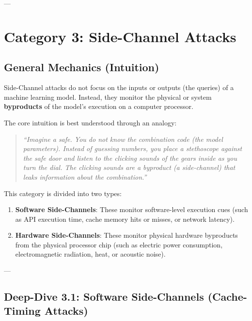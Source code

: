 \documentclass{article}
\begin{document}
---

\section{Category 3: Side-Channel Attacks}

\subsection{General Mechanics (Intuition)}
Side-Channel attacks do not focus on the inputs or outputs (the queries) of a machine learning model. Instead, they monitor the physical or system \textbf{byproducts} of the model's execution on a computer processor.

The core intuition is best understood through an analogy:
\begin{quote}
    \textit{``Imagine a safe. You do not know the combination code (the model parameters). Instead of guessing numbers, you place a stethoscope against the safe door and listen to the clicking sounds of the gears inside as you turn the dial. The clicking sounds are a byproduct (a side-channel) that leaks information about the combination.''}
\end{quote}

This category is divided into two types:
\begin{enumerate}
    \item \textbf{Software Side-Channels}: These monitor software-level execution cues (such as API execution time, cache memory hits or misses, or network latency).
    \item \textbf{Hardware Side-Channels}: These monitor physical hardware byproducts from the physical processor chip (such as electric power consumption, electromagnetic radiation, heat, or acoustic noise).
\end{enumerate}

---

\subsection{Deep-Dive 3.1: Software Side-Channels (Cache-Timing Attacks)}
\end{document}
